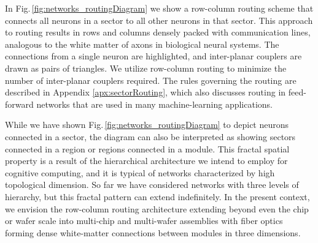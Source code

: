 \documentclass[twocolumn]{article}
\begin{document}
In Fig.\,\ref{fig:networks_routingDiagram} we show a row-column routing scheme that connects all neurons in a sector to all other neurons in that sector. This approach to routing results in rows and columns densely packed with communication lines, analogous to the white matter of axons in biological neural systems. The connections from a single neuron are highlighted, and inter-planar couplers are drawn as pairs of triangles. We utilize row-column routing to minimize the number of inter-planar couplers required. The rules governing the routing are described in Appendix \ref{apx:sectorRouting}, which also discusses routing in feed-forward networks that are used in many machine-learning applications.

While we have shown Fig.\,\ref{fig:networks_routingDiagram} to depict neurons connected in a sector, the diagram can also be interpreted as showing sectors connected in a region or regions connected in a module. This fractal spatial property is a result of the hierarchical architecture we intend to employ for cognitive computing, and it is typical of networks characterized by high topological dimension. So far we have considered networks with three levels of hierarchy, but this fractal pattern can extend indefinitely. In the present context, we envision the row-column routing architecture extending beyond even the chip or wafer scale into multi-chip and multi-wafer assemblies with fiber optics forming dense white-matter connections between modules in three dimensions. 
\end{document}
